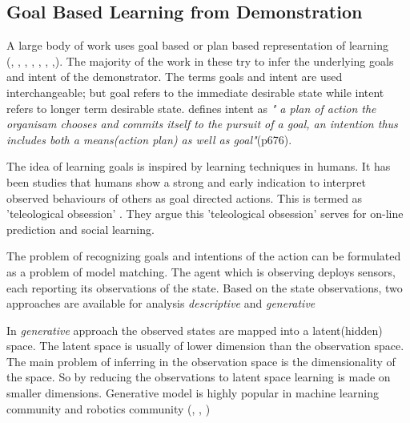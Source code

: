 \subsection{Goal Based Learning from Demonstration}
A large body of work uses
goal based or plan based representation of learning\\
(\cite{friedrich_robot_1995},
\cite{nicolescu_natural_2003}, \cite{csibra_obsessed_2007}, \cite{demiris_prediction_2007},
\cite{veeraraghavan_teaching_2008}, \cite{lee_effective_2009}, \cite{hommel_action_2009},\cite{abdo_learning_2013}). 
The majority of the work in these try to infer the underlying goals and intent of
the demonstrator. The terms goals and intent are used interchangeable; but
goal refers to the immediate desirable state while intent refers to longer term
desirable state. \cite{tomasello_understanding_2005} defines intent as \textit{" a plan of
    action the organisam chooses and commits itself to the pursuit of a goal,
an intention thus includes both a means(action plan) as well as goal"}(p676).

The idea of learning goals is inspired by learning techniques in humans. It has
been studies that humans show a strong and early indication to interpret
observed behaviours of others as goal directed actions. This is termed as
'teleological obsession' \cite{ csibra_obsessed_2007} . They argue this
'teleological obsession' serves for on-line prediction and social learning.

The problem of recognizing goals and intentions of the action can be formulated
as a problem of model matching. The agent which is observing deploys sensors,
each reporting its observations of the state. Based on the state observations, two
approaches are available for analysis \textit{descriptive} and \textit{generative}
\cite { demiris_prediction_2007}

In \textit{generative} approach the observed states are mapped into a latent(hidden)
space. The latent space is usually of lower dimension than the observation
space. The main problem of inferring in the observation space is the
dimensionality of the space. So by reducing the observations to latent space
learning is made on smaller dimensions. Generative model is highly popular in
machine learning community and robotics community (\cite{buxton_learning_2003}, \cite{bishop_pattern_2006}
, \cite{calinon_robot_2009})

